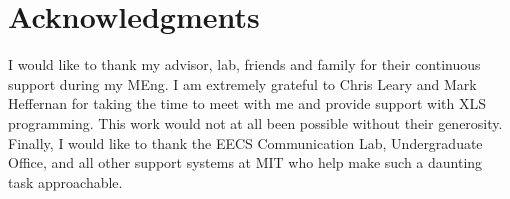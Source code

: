 \chapter*{Acknowledgments}

I would like to thank my advisor, lab, friends and family for their continuous support during my MEng. I am extremely grateful to Chris Leary and Mark Heffernan for taking the time to meet with me and provide support with XLS programming. This work would not at all been possible without their generosity. Finally, I would like to thank the EECS Communication Lab, Undergraduate Office, and all other support systems at MIT who help make such a daunting task approachable.